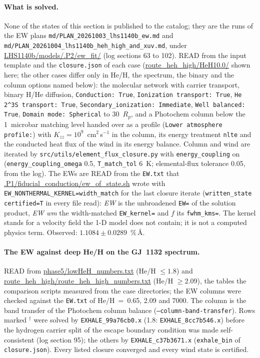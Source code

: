 \documentclass[11pt]{my_memo}
\begin{document}
\paragraph{What is solved.} None of the states of this section is published
to the catalog; they are the runs of the EW plans
\texttt{md/PLAN\_20261003\_lhs1140b\_ew.md} and
\texttt{md/PLAN\_20261004\_lhs1140b\_heh\_high\_and\_xuv.md}, under
\url{LHS1140b/models/.P2/ew_fit/} (log sections 63 to 102). READ from the
input template and the \texttt{closure.json} of each case
(\url{route_heh_high/HeH10.0/} shown here; the other cases differ only in
He/H, the spectrum, the binary and the column options named below): the
molecular network with carrier transport, binary H/He diffusion,
\texttt{Conduction: True}, \texttt{Ionization transport: True},
\texttt{He 2\^{}3S transport: True}, \texttt{Secondary\_ionization:
Immediate}, \texttt{Well balanced: True}, \texttt{Domain mode: Spherical} to
30~$R_p$, and a Photochem column below the 1~microbar matching level handed
over as a profile (\texttt{Lower atmosphere profile:}) with
$K_{zz}=10^{9}$~cm$^2$\,s$^{-1}$ in the column, its energy treatment
\texttt{nlte} and the conducted heat flux of the wind in its energy balance.
Column and wind are iterated by \texttt{src/utils/element\_flux\_closure.py}
with \texttt{energy\_coupling} on (\texttt{energy\_coupling\_omega} 0.5,
\texttt{T\_match\_tol} 6~K; elemental-flux tolerance 0.05, from the log). The
EWs are READ from the \texttt{EW.txt} that
\url{.P1/fiducial_conduction/ew_of_state.sh} wrote with
\texttt{EW\_NONTHERMAL\_KERNEL=width\_match} for the last closure iterate
(\texttt{written\_state certified=T} in every file read): \emph{EW} is the
unbroadened \texttt{EW=} of the solution product, \emph{EW wm} the
width-matched \texttt{EW\_kernel=} and $f$ its \texttt{fwhm\_kms=}. The
kernel stands for a velocity field the 1-D model does not contain; it is not
a computed physics term. Observed: $1.1084\pm0.0289$~\%\,\AA.

\paragraph{The EW against deep He/H on the GJ~1132 spectrum.} READ from
\url{phase5/lowHeH_numbers.txt} (He/H $\le 1.8$) and
\url{route_heh_high/route_heh_high_numbers.txt} (He/H $\ge 2.09$), the tables
the comparison scripts measured from the case directories; the EW columns
were checked against the \texttt{EW.txt} of He/H~=~0.65, 2.09 and 7000. The
column is the band transfer of the Photochem column balance
(\texttt{--column-band-transfer}). Rows marked $^{\dagger}$ were solved by
\texttt{EXHALE\_99a76cb0.x} (1.8: \texttt{EXHALE\_8cc7b546.x}) before the
hydrogen carrier split of the escape boundary condition was made
self-consistent (log section 95); the others by \texttt{EXHALE\_c37b3671.x}
(\texttt{exhale\_bin} of \texttt{closure.json}). Every listed closure
converged and every wind state is certified.
\end{document}
